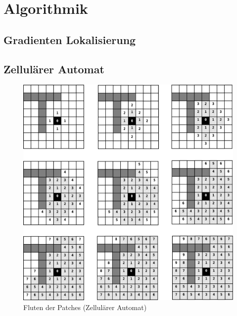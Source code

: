 \chapter{Algorithmik}
\label{cha:algorithmik}

\section{Gradienten Lokalisierung}
\label{sec:gradient_localization}



\section{Zellul\"arer Automat}
\label{sec:cellular_automaton}

\begin{figure}
\centering
\includegraphics[height=0.9\textwidth]{algorithmik/flooding.eps}
\caption{Fluten der Patches (Zellulärer Automat)}
\label{fig:flooding}
\end{figure}

